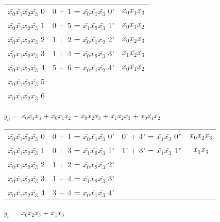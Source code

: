 \documentclass{bmstu}
\begin{document}
	\begin{center}
		\begin{tabular}{ |c|c|c| }       
			\hline
		$\bar{x_0} \bar{x_1} \bar{x_2} \bar{x_3} $  0&0 + 1 = $\bar{x_0} \bar{x_1} \bar{x_3} $  0' &$\bar{x_0} \bar{x_1} \bar{x_3} $\\
		$\bar{x_0} \bar{x_1} x_2 \bar{x_3} $  1&0 + 5 = $\bar{x_1} \bar{x_2} \bar{x_3} $  1' &$\bar{x_0} \bar{x_1} x_2 $\\
		$\bar{x_0} \bar{x_1} x_2 x_3 $  2&1 + 2 = $\bar{x_0} \bar{x_1} x_2 $  2' &$\bar{x_0} x_2 \bar{x_3} $\\
		$\bar{x_0} x_1 \bar{x_2} x_3 $  3&1 + 4 = $\bar{x_0} x_2 \bar{x_3} $  3' &$\bar{x_1} \bar{x_2} \bar{x_3} $\\
		$\bar{x_0} x_1 x_2 \bar{x_3} $  4&5 + 6 = $x_0 \bar{x_1} \bar{x_2} $  4' &$x_0 \bar{x_1} \bar{x_2} $\\
		$x_0 \bar{x_1} \bar{x_2} \bar{x_3} $  5& &   \\
		$x_0 \bar{x_1} \bar{x_2} x_3 $  6& &   \\
			\hline
		\end{tabular}
	\end{center}
	$y_d =$ $\bar{x_0} \bar{x_1} \bar{x_3} $ + $\bar{x_0} \bar{x_1} x_2 $ + $\bar{x_0} x_2 \bar{x_3} $ + $\bar{x_1} \bar{x_2} \bar{x_3} $ + $x_0 \bar{x_1} \bar{x_2} $


	\begin{center}
		\begin{tabular}{ |c|c|c|c| }
			\hline
		$\bar{x_0} \bar{x_1} \bar{x_2} \bar{x_3} $  0&0 + 1 = $\bar{x_0} \bar{x_1} \bar{x_3} $  0' &0' + 4' = $\bar{x_1} \bar{x_3} $  0'' &$\bar{x_0} x_2 \bar{x_3} $\\
		$\bar{x_0} \bar{x_1} x_2 \bar{x_3} $  1&0 + 3 = $\bar{x_1} \bar{x_2} \bar{x_3} $  1' &1' + 3' = $\bar{x_1} \bar{x_3} $  1'' &$\bar{x_1} \bar{x_3} $\\
		$\bar{x_0} x_1 x_2 \bar{x_3} $  2&1 + 2 = $\bar{x_0} x_2 \bar{x_3} $  2' & &   \\
		$x_0 \bar{x_1} \bar{x_2} \bar{x_3} $  3&1 + 4 = $\bar{x_1} x_2 \bar{x_3} $  3' & &   \\
		$x_0 \bar{x_1} x_2 \bar{x_3} $  4&3 + 4 = $x_0 \bar{x_1} \bar{x_3} $  4' & &   \\
			\hline
		\end{tabular}
	\end{center}
	$y_e =$ $\bar{x_0} x_2 \bar{x_3} $ + $\bar{x_1} \bar{x_3} $
\end{document}
